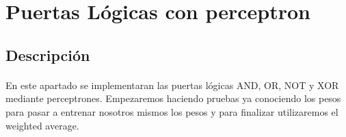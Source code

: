 \documentclass{report}
\begin{document}
    \section{Puertas Lógicas con perceptron} %
      \subsection*{Descripción}
        \paragraph*{}{
          En este apartado se implementaran las puertas lógicas AND, OR, NOT y XOR mediante perceptrones.
          Empezaremos haciendo pruebas ya conociendo los pesos para pasar a entrenar nosotros mismos los pesos y para finalizar utilizaremos el weighted average.
        }
\end{document}
